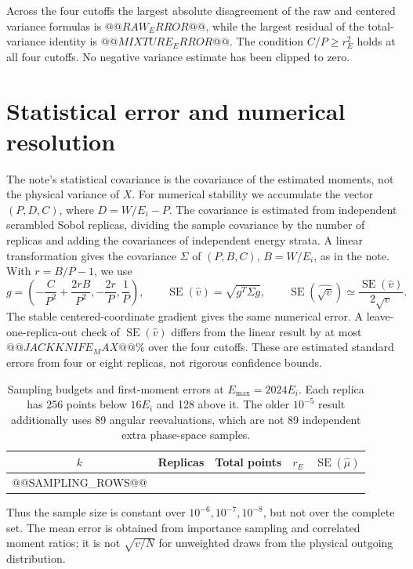 \documentclass[10pt,a4paper]{article}
\newcommand{\SE}{\operatorname{SE}}
\begin{document}
Across the four cutoffs the largest absolute disagreement of the raw
and centered variance formulas is $@@RAW_ERROR@@$, while the largest
residual of the total-variance identity is $@@MIXTURE_ERROR@@$.
The condition $C/P\ge r_E^2$ holds at all four cutoffs. No negative
variance estimate has been clipped to zero.

\clearpage
\section{Statistical error and numerical resolution}
The note's statistical covariance is the covariance of the estimated
moments, not the physical variance of $X$. For numerical stability we
accumulate the vector $(P,D,C)$, where $D=W/E_i-P$.
The covariance is estimated from independent scrambled Sobol replicas,
dividing the sample covariance by the number of replicas and adding
the covariances of independent energy strata. A linear transformation
gives the covariance $\Sigma$ of $(P,B,C)$, $B=W/E_i$, as in the note.
With $r=B/P-1$, we use
\[
 g=\left(-\frac{C}{P^2}+\frac{2rB}{P^2},
          -\frac{2r}{P},\frac1P\right),\qquad
 \SE(\widehat v)=\sqrt{g^T\Sigma g},\qquad
 \SE(\widehat{\sqrt v})\simeq\frac{\SE(\widehat v)}{2\sqrt v}.
\]
The stable centered-coordinate gradient gives the same numerical error.
A leave-one-replica-out check of $\SE(\widehat v)$ differs from the
linear result by at most $@@JACKKNIFE_MAX@@\%$ over the four cutoffs.
These are estimated standard errors from four or eight replicas, not
rigorous confidence bounds.

\begin{table}[h!]
\centering\small
\caption{Sampling budgets and first-moment errors at $E_{\max}=2024E_i$.
Each replica has 256 points below $16E_i$ and 128 above it. The older
$10^{-5}$ result additionally uses 89 angular reevaluations, which are
not 89 independent extra phase-space samples.}
\begin{tabular}{ccccc}
\toprule
$k$ & Replicas & Total points & $r_E$ & $\SE(\widehat\mu)$\\
\midrule
@@SAMPLING_ROWS@@
\bottomrule
\end{tabular}
\end{table}

Thus the sample size is constant over $10^{-6},10^{-7},10^{-8}$, but
not over the complete set. The mean error is obtained from importance
sampling and correlated moment ratios; it is not $\sqrt{v/N}$ for
unweighted draws from the physical outgoing distribution.
\end{document}
